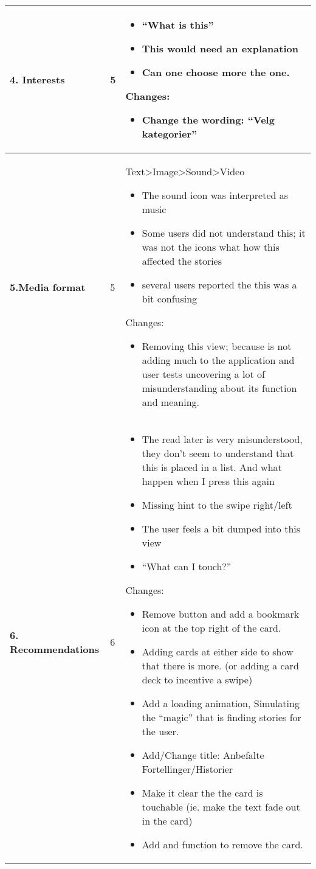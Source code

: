 {\begin{center}
\begin{longtable}{ | p{4cm} | p{3cm} | p{9cm}|}
			\textbf{4. Interests} & 5  & 
			\begin{itemize}		
			\item “What is this”
			\item This would need an explanation 
			\item Can one choose more the one.
			\end{itemize}			
			Changes:
			\begin{itemize}
			\item Change the wording: “Velg kategorier”
			\end{itemize}\\\hline
			\textbf{5.Media format} & 5 & 
			Text>Image>Sound>Video
				\begin{itemize}
			\item The sound icon was interpreted as music
			\item Some users did not understand this; it was not the icons what how this affected the stories
			\item several users reported the this was a bit confusing 
			\end{itemize}
			Changes:
			\begin{itemize}
			\item Removing this view; because is not adding much to the application and user tests uncovering a lot of misunderstanding about its function and meaning.
			\end{itemize}
			\\\hline
			
			\textbf{6. Recommendations} & 6 & 
			\begin{itemize}

			\item The read later is very misunderstood, they don’t seem to understand that this is placed in a list. And what happen when I press this again
			\item Missing hint to the swipe right/left
			\item The user feels a bit dumped into this view
			\item “What can I touch?”
			\end{itemize}
			Changes:
			\begin{itemize}
			\item Remove button and add a bookmark icon at the top right of the card. 
			\item Adding cards at either side to show that there is more. (or adding a card deck to incentive a swipe)
			\item Add a loading animation, Simulating the “magic” that is finding stories for the user.
			\item Add/Change title: Anbefalte Fortellinger/Historier
			\item Make it clear the the card is touchable (ie. make the text fade out in the card)
			\item Add and function to remove the card.
			\end{itemize}
								\\\hline
								

\end{longtable}
\end{center}}
